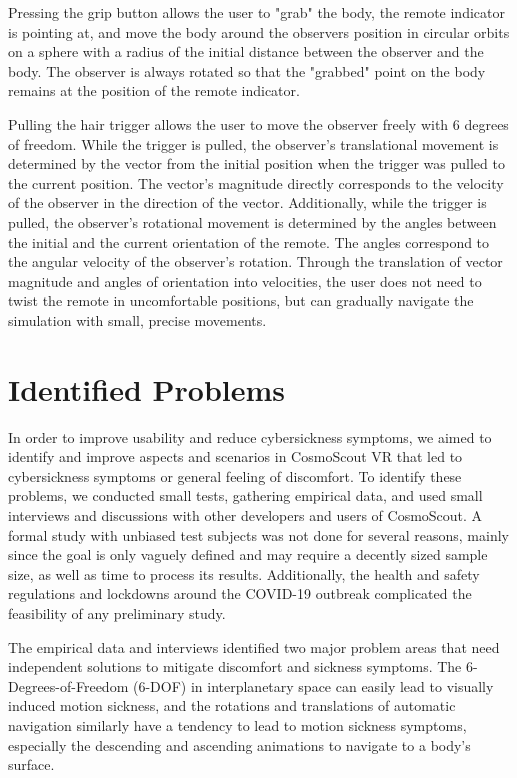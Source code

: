 Pressing the grip button allows the user to "grab" the body, the remote indicator is pointing at, and move the body
around the observers position in circular orbits on a sphere with a radius of the initial distance between the
observer and the body.
The observer is always rotated so that the "grabbed" point on the body remains at the position of the remote indicator.

Pulling the hair trigger allows the user to move the observer freely with 6 degrees of freedom.
While the trigger is pulled, the observer's translational movement is determined by the vector from the initial
position when the trigger was pulled to the current position.
The vector's magnitude directly corresponds to the velocity of the observer in the direction of the vector.
Additionally, while the trigger is pulled, the observer's rotational movement is determined by the angles between the
initial and the current orientation of the remote.
The angles correspond to the angular velocity of the observer's rotation.
Through the translation of vector magnitude and angles of orientation into velocities, the user does not need to
twist the remote in uncomfortable positions, but can gradually navigate the simulation with small, precise movements.


\section{Identified Problems}\label{sec:identified-problems}

In order to improve usability and reduce cybersickness symptoms, we aimed to identify and improve aspects and
scenarios in CosmoScout VR that led to cybersickness symptoms or general feeling of discomfort.
To identify these problems, we conducted small tests, gathering empirical data, and used small interviews and
discussions with other developers and users of CosmoScout.
A formal study with unbiased test subjects was not done for several reasons, mainly since the goal is only vaguely
defined and may require a decently sized sample size, as well as time to process its results.
Additionally, the health and safety regulations and lockdowns around the COVID-19 outbreak complicated the feasibility
of any preliminary study.

The empirical data and interviews identified two major problem areas that need independent solutions to mitigate
discomfort and sickness symptoms.
The 6-Degrees-of-Freedom (6-DOF) in interplanetary space can easily lead to visually induced motion sickness, and the
rotations and translations of automatic navigation similarly have a tendency to lead to motion sickness symptoms,
especially the descending and ascending animations to navigate to a body's surface.


